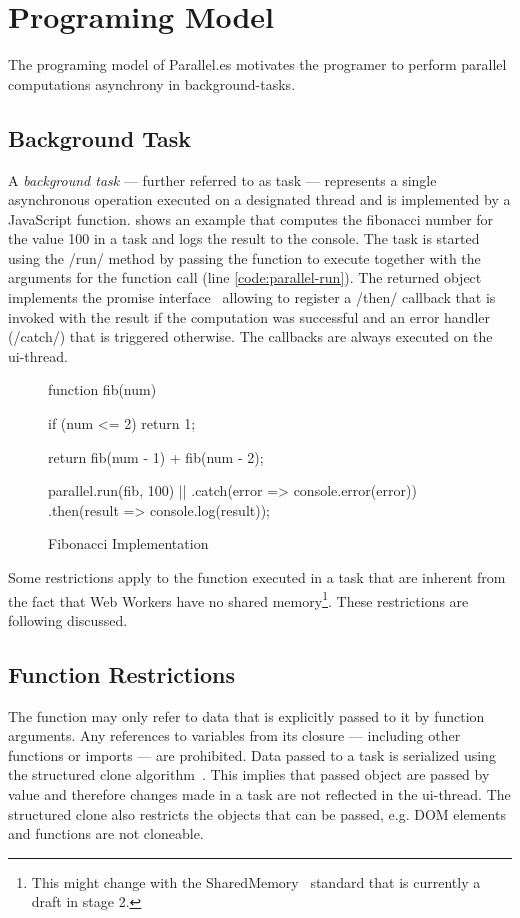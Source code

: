 \section{Programing Model}\label{sec:programing-model}
The programing model of Parallel.es motivates the programer to perform parallel computations asynchrony in background-tasks. 

\subsection{Background Task}
A \textit{background task} --- further referred to as task --- represents a single asynchronous operation executed on a designated thread and is implemented by a JavaScript function.  shows an example that computes the fibonacci number for the value 100 in a task and logs the result to the console. The task is started using the \javascriptinline/run/ method by passing the function to execute together with the arguments for the function call (line \ref{code:parallel-run}). The returned object implements the promise interface~\cite[Section 18.3.18]{ecmaScript2015} allowing to register a \javascriptinline/then/ callback that is invoked with the result if the computation was successful and an error handler (\javascriptinline/catch/) that is triggered otherwise. The callbacks are always executed on the ui-thread. 


\begin{figure}
	\begin{javascriptcode}
function fib(num) {
	if (num <= 2) {
    	return 1;
	}

	return fib(num - 1) + fib(num - 2);
}
        
parallel.run(fib, 100) |$\label{code:parallel-run}$|
	.catch(error => console.error(error))
	.then(result => console.log(result));	
	\end{javascriptcode}

	\caption{Fibonacci Implementation}
	\label{fig:fibonacci-implementation}
\end{figure}

Some restrictions apply to the function executed in a task that are inherent from the fact that Web Workers have no shared memory\footnote{This might change with the SharedMemory~\cite{Ecma2016} standard that is currently a draft in stage 2.}. These restrictions are following discussed.

\subsection{Function Restrictions}
The function may only refer to data that is explicitly passed to it by function arguments. Any references to variables from its closure --- including other functions or imports --- are prohibited. Data passed to a task is serialized using the structured clone algorithm~\cite[Section 2.9.4]{WHATWG2016}. This implies that passed object are passed by value and therefore changes made in a task are not reflected in the ui-thread. The structured clone also restricts the objects that can be passed, e.g. DOM elements and functions are not cloneable. 

